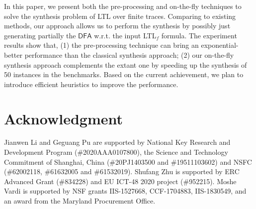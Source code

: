 \documentclass[letterpaper]{article} %
\newcommand{\ltlf}{\textsf{LTL}$_f$\xspace}
\newcommand{\ltl}{\textsf{LTL}\xspace}
\def\dfa{$\mathsf{DFA}$\xspace}
\begin{document}
In this paper, we present both the pre-processing and on-the-fly techniques to solve the synthesis problem of \ltl over finite traces. Comparing to existing methods, our approach allows us to perform the synthesis by possibly just generating partially the \dfa w.r.t. the input \ltlf formula. The experiment results show that, (1) the pre-processing technique can bring an exponential-better performance than the classical synthesis approach; (2) our on-the-fly synthesis approach complements the extant one by speeding up the synthesis of 50 instances in the benchmarks.  
Based on the current achievement, we plan to introduce efficient heuristics to improve the performance.



\section{Acknowledgment}
Jianwen Li and Geguang Pu are supported by  National Key Research and Development Program (\#2020AAA0107800), the Science and Technology Commitment of Shanghai, China (\#20PJ1403500 and \#19511103602) and NSFC (\#62002118, \#61632005 and \#61532019). Shufang Zhu is supported by ERC Advanced Grant (\#834228) and EU ICT-48 2020 project (\#952215). Moshe Vardi is supported by NSF grants IIS-1527668, CCF-1704883,
IIS-1830549, and an award from the Maryland Procurement Office.

%


%
\end{document}
